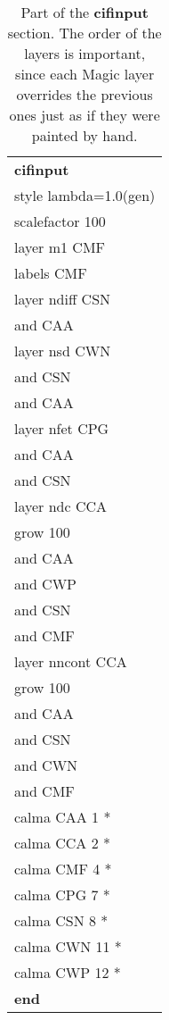 \documentclass[letterpaper,twoside,12pt]{article}
\def\hinch{\hspace*{0.5in}}
\def\I{\hinch}
\def\II{\I\I}
\begin{document}
\begin{table}[ht!]
   \begin{center}
      \begin{tabular}{|l|} \hline
	   {\bfseries cifinput} \\
	   style lambda=1.0(gen) \\
    	   \I scalefactor 100 \\
    	   \I layer m1 CMF \\
           \II  labels CMF \\
    	   \I layer ndiff CSN \\
           \II  and CAA \\
    	   \I layer nsd CWN \\
           \II  and CSN \\
           \II  and CAA \\
    	   \I layer nfet CPG \\
           \II  and CAA \\
           \II  and CSN \\
    	   \I layer ndc CCA \\
           \II  grow 100 \\
           \II  and CAA \\
           \II  and CWP \\
           \II  and CSN \\
           \II  and CMF \\
    	   \I layer nncont CCA \\
           \II  grow 100 \\
           \II  and CAA \\
           \II  and CSN \\
           \II  and CWN \\
           \II  and CMF \\
    	   \I calma CAA 1 * \\
    	   \I calma CCA 2 * \\
    	   \I calma CMF 4 * \\
    	   \I calma CPG 7 * \\
    	   \I calma CSN 8 * \\
    	   \I calma CWN 11 * \\
    	   \I calma CWP 12 * \\
	   {\bfseries end} \\ \hline
      \end{tabular}
      \caption{Part of the {\bfseries cifinput} section.  The order of
	the layers is important, since each Magic layer overrides the
	previous ones just as if they were painted by hand.}
      \label{cifinput}
   \end{center}
\end{table}
\end{document}
